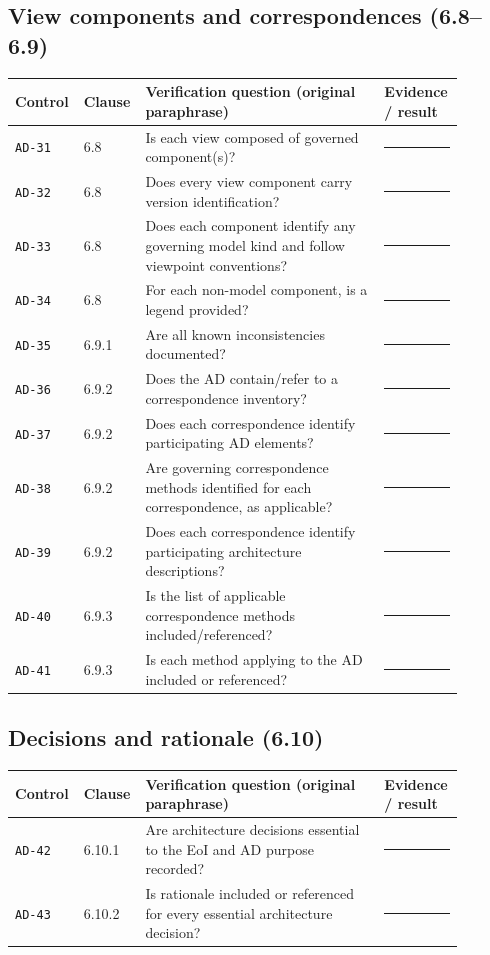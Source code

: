 \documentclass[11pt,letterpaper]{article}
\newcommand{\AuditingHead}{\begin{longtable}{p{0.10\linewidth}p{0.10\linewidth}p{0.52\linewidth}p{0.17\linewidth}}\toprule\textbf{Control}&\textbf{Clause}&\textbf{Verification question (original paraphrase)}&\textbf{Evidence / result}\\\midrule\endhead}
\newcommand{\AuditingEnd}{\bottomrule\end{longtable}}
\newcommand{\AuditRow}[4]{\texttt{#1} & #2 & #3 & #4\\}
\begin{document}
\subsection{View components and correspondences (6.8--6.9)}
\AuditingHead
\AuditRow{AD-31}{6.8}{Is each view composed of governed component(s)?}{\rule[-0.4em]{0pt}{2em}\rule{0.60\linewidth}{0.4pt}}
\AuditRow{AD-32}{6.8}{Does every view component carry version identification?}{\rule[-0.4em]{0pt}{2em}\rule{0.60\linewidth}{0.4pt}}
\AuditRow{AD-33}{6.8}{Does each component identify any governing model kind and follow viewpoint conventions?}{\rule[-0.4em]{0pt}{2em}\rule{0.60\linewidth}{0.4pt}}
\AuditRow{AD-34}{6.8}{For each non-model component, is a legend provided?}{\rule[-0.4em]{0pt}{2em}\rule{0.60\linewidth}{0.4pt}}
\AuditRow{AD-35}{6.9.1}{Are all known inconsistencies documented?}{\rule[-0.4em]{0pt}{2em}\rule{0.60\linewidth}{0.4pt}}
\AuditRow{AD-36}{6.9.2}{Does the AD contain/refer to a correspondence inventory?}{\rule[-0.4em]{0pt}{2em}\rule{0.60\linewidth}{0.4pt}}
\AuditRow{AD-37}{6.9.2}{Does each correspondence identify participating AD elements?}{\rule[-0.4em]{0pt}{2em}\rule{0.60\linewidth}{0.4pt}}
\AuditRow{AD-38}{6.9.2}{Are governing correspondence methods identified for each correspondence, as applicable?}{\rule[-0.4em]{0pt}{2em}\rule{0.60\linewidth}{0.4pt}}
\AuditRow{AD-39}{6.9.2}{Does each correspondence identify participating architecture descriptions?}{\rule[-0.4em]{0pt}{2em}\rule{0.60\linewidth}{0.4pt}}
\AuditRow{AD-40}{6.9.3}{Is the list of applicable correspondence methods included/referenced?}{\rule[-0.4em]{0pt}{2em}\rule{0.60\linewidth}{0.4pt}}
\AuditRow{AD-41}{6.9.3}{Is each method applying to the AD included or referenced?}{\rule[-0.4em]{0pt}{2em}\rule{0.60\linewidth}{0.4pt}}
\AuditingEnd
\subsection{Decisions and rationale (6.10)}
\AuditingHead
\AuditRow{AD-42}{6.10.1}{Are architecture decisions essential to the EoI and AD purpose recorded?}{\rule[-0.4em]{0pt}{2em}\rule{0.60\linewidth}{0.4pt}}
\AuditRow{AD-43}{6.10.2}{Is rationale included or referenced for every essential architecture decision?}{\rule[-0.4em]{0pt}{2em}\rule{0.60\linewidth}{0.4pt}}
\AuditingEnd
\end{document}

